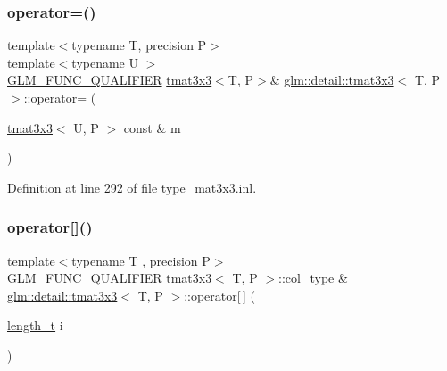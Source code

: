 \mbox{\label{structglm_1_1detail_1_1tmat3x3_a460c6e70ac10a60f30d800146e65f1ba}} 
\subsubsection{\texorpdfstring{operator=()}{operator=()}\hspace{0.1cm}{\footnotesize\ttfamily [3/3]}}
{\footnotesize\ttfamily template$<$typename T, precision P$>$ \\
template$<$typename U $>$ \\
\hyperlink{setup_8hpp_a33fdea6f91c5f834105f7415e2a64407}{G\+L\+M\+\_\+\+F\+U\+N\+C\+\_\+\+Q\+U\+A\+L\+I\+F\+I\+ER} \hyperlink{structglm_1_1detail_1_1tmat3x3}{tmat3x3}$<$T, P$>$\& \hyperlink{structglm_1_1detail_1_1tmat3x3}{glm\+::detail\+::tmat3x3}$<$ T, P $>$\+::operator= (\begin{DoxyParamCaption}\item[{\hyperlink{structglm_1_1detail_1_1tmat3x3}{tmat3x3}$<$ U, P $>$ const \&}]{m }\end{DoxyParamCaption})}



Definition at line 292 of file type\+\_\+mat3x3.\+inl.

\mbox{\label{structglm_1_1detail_1_1tmat3x3_ac99796f89cd590265d02f98850605043}} 
\subsubsection{\texorpdfstring{operator[]()}{operator[]()}\hspace{0.1cm}{\footnotesize\ttfamily [1/2]}}
{\footnotesize\ttfamily template$<$typename T , precision P$>$ \\
\hyperlink{setup_8hpp_a33fdea6f91c5f834105f7415e2a64407}{G\+L\+M\+\_\+\+F\+U\+N\+C\+\_\+\+Q\+U\+A\+L\+I\+F\+I\+ER} \hyperlink{structglm_1_1detail_1_1tmat3x3}{tmat3x3}$<$ T, P $>$\+::\hyperlink{structglm_1_1detail_1_1tmat3x3_ad47f3a11bd4333d1103bfa93a86fa54f}{col\+\_\+type} \& \hyperlink{structglm_1_1detail_1_1tmat3x3}{glm\+::detail\+::tmat3x3}$<$ T, P $>$\+::operator\mbox{[}$\,$\mbox{]} (\begin{DoxyParamCaption}\item[{\hyperlink{namespaceglm_a090a0de2260835bee80e71a702492ed9}{length\+\_\+t}}]{i }\end{DoxyParamCaption})}



